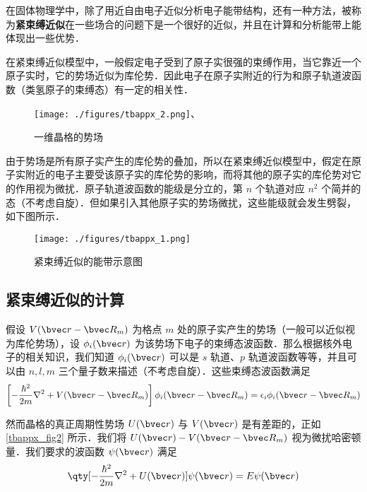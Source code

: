 

在固体物理学中，除了用近自由电子近似分析电子能带结构，还有一种方法，被称为\textbf{紧束缚近似}在一些场合的问题下是一个很好的近似，并且在计算和分析能带上能体现出一些优势．

在紧束缚近似模型中，一般假定电子受到了原子实很强的束缚作用，当它靠近一个原子实时，它的势场近似为库伦势．因此电子在原子实附近的行为和原子轨道波函数（类氢原子的束缚态）有一定的相关性．
\begin{figure}[ht]
\centering
\texttt{[image: ./figures/tbappx\_2.png]}、
\caption{一维晶格的势场} \label{tbappx_fig2}
\end{figure}


由于势场是所有原子实产生的库伦势的叠加，所以在紧束缚近似模型中，假定在原子实附近的电子主要受该原子实的库伦势的影响，而将其他的原子实的库伦势对它的作用视为微扰．原子轨道波函数的能级是分立的，第 $n$ 个轨道对应 $n^2$ 个简并的态（不考虑自旋）．但如果引入其他原子实的势场微扰，这些能级就会发生劈裂，如下图所示．

\begin{figure}[ht]
\centering
\texttt{[image: ./figures/tbappx\_1.png]}
\caption{紧束缚近似的能带示意图} \label{tbappx_fig1}
\end{figure}

\subsection{紧束缚近似的计算}

假设 $V(\bvec r-\bvec R_m)$ 为格点 $m$ 处的原子实产生的势场（一般可以近似视为库伦势场），设 $\phi_i(\bvec r)$ 为该势场下电子的束缚态波函数．那么根据核外电子的相关知识，我们知道 $\phi_i(\bvec r)$ 可以是 $s$ 轨道、$p$ 轨道波函数等等，并且可以由 $n,l,m$ 三个量子数来描述（不考虑自旋）．这些束缚态波函数满足
\begin{equation}
\left[-\frac{\hbar^2}{2m}\nabla^2+V(\bvec r-\bvec R_m)\right]\phi_i(\bvec r-\bvec R_m)=\epsilon_i\phi_i(\bvec r-\bvec R_m)
\end{equation}

然而晶格的真正周期性势场 $U(\bvec r)$ 与 $V(\bvec r)$ 是有差距的，正如 \autoref{tbappx_fig2} 所示．我们将 $U(\bvec r)-V(\bvec r-\bvec R_m)$ 视为微扰哈密顿量．我们要求的波函数 $\psi(\bvec r)$ 满足
\begin{equation}\label{tbappx_eq1}
\qty[-\frac{\hbar^2}{2m}\nabla^2+U(\bvec r)]\psi(\bvec r)=E\psi(\bvec r)
\end{equation}

